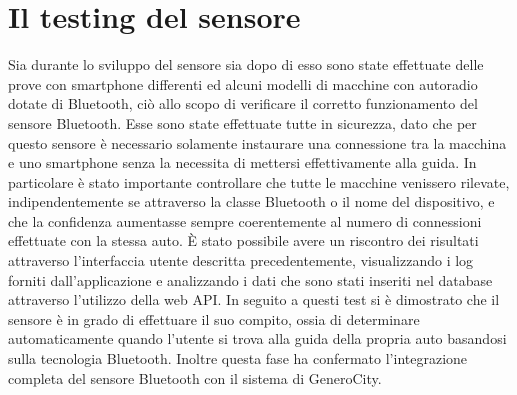 \section{Il testing del sensore}
Sia durante lo sviluppo del sensore sia dopo di esso sono state effettuate delle prove con smartphone differenti ed alcuni modelli di macchine con autoradio dotate di Bluetooth, ciò allo scopo di verificare il corretto funzionamento del sensore Bluetooth. Esse sono state effettuate tutte in sicurezza, dato che per questo sensore è necessario solamente instaurare una connessione tra la macchina e uno smartphone senza la necessita di mettersi effettivamente alla guida. In particolare è stato importante controllare che tutte le macchine venissero rilevate, indipendentemente se attraverso la classe Bluetooth o il nome del dispositivo, e che la confidenza aumentasse sempre coerentemente al numero di connessioni effettuate con la stessa auto. È stato possibile avere un riscontro dei risultati attraverso l'interfaccia utente descritta precedentemente, visualizzando i log forniti dall'applicazione e analizzando i dati che sono stati inseriti nel database attraverso l'utilizzo della web API. In seguito a questi test si è dimostrato che il sensore è in grado di effettuare il suo compito, ossia di determinare automaticamente quando l'utente si trova alla guida della propria auto basandosi sulla tecnologia Bluetooth. Inoltre questa fase ha confermato l'integrazione completa del sensore Bluetooth con il sistema di GeneroCity.